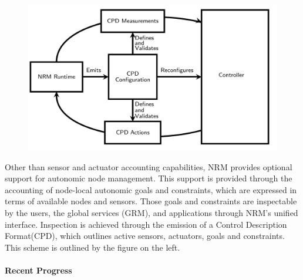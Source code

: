 \begin{figure}
\includegraphics[width=.38\textwidth]{projects/2.3.1-PMR/2.3.1.19-Argo-PowerSteering/cpd}
\end{figure}
Other than sensor and actuator accounting capabilities, NRM provides
optional support for autonomic node management. This support is provided through
the accounting of node-local autonomic goals and constraints, which are
expressed in terms of available nodes and sensors. Those goals and
constraints are inspectable by the users, the global services (GRM), and
applications through NRM's unified interface. Inspection is achieved through
the emission of a Control Description Format(CPD), which outlines active
sensors, actuators, goals and constraints. This scheme is outlined by the
figure on the left.

\paragraph{Recent Progress}



